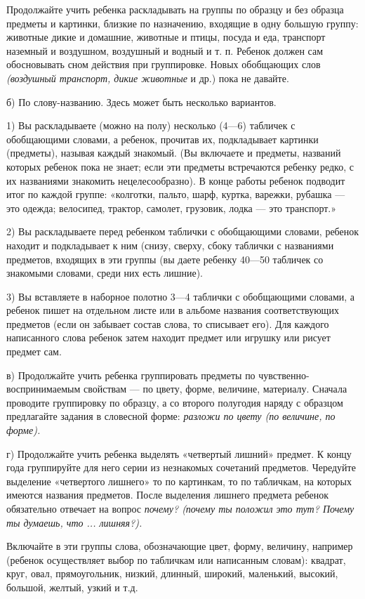 \documentclass[a5paper]{book}
\renewcommand{\emph}[1]{\textit{#1}}
\begin{document}
Продолжайте учить ребенка раскладывать на группы по образцу и без
образца предметы и картинки, близкие по назначению, входящие в одну
большую группу: животные дикие и домашние, животные и птицы, посуда и
еда, транспорт наземный и воздушном, воздушный и водный и т. п. Ребенок
должен сам обосновывать сном действия при группировке. Новых обобщающих
слов \emph{(воздушный транспорт, дикие животные} и др.) пока не давайте.

б) По слову-названию. Здесь может быть несколько вариантов.

1) Вы раскладываете (можно на полу) несколько (4---6) табличек с
обобщающими словами, а ребенок, прочитав их, подкладывает картинки
(предметы), называя каждый знакомый. (Вы включаете и предметы, названий
которых ребенок пока не знает; если эти предметы встречаются ребенку
редко, с их названиями знакомить нецелесообразно). В конце работы
ребенок подводит итог по каждой группе: «колготки, пальто, шарф, куртка,
варежки, рубашка --- это одежда; велосипед, трактор, самолет, грузовик,
лодка --- это транспорт.»

2) Вы раскладываете перед ребенком таблички с обобщающими словами,
ребенок находит и подкладывает к ним (снизу, сверху, сбоку таблички с
названиями предметов, входящих в эти группы (вы даете ребенку 40---50
табличек со знакомыми словами, среди них есть лишние).

3) Вы вставляете в наборное полотно 3---4 таблички с обобщающими
словами, а ребенок пишет на отдельном листе или в альбоме названия
соответствующих предметов (если он забывает состав слова, то списывает
его). Для каждого написанного слова ребенок затем находит предмет или
игрушку или рисует предмет сам.

в) Продолжайте учить ребенка группировать предметы по
чувственно-воспринимаемым свойствам --- по цвету, форме, величине,
материалу. Сначала проводите группировку по образцу, а со второго
полугодия наряду с образцом предлагайте задания в словесной форме:
\emph{разложи по цвету (по величине, по форме).}

г) Продолжайте учить ребенка выделять «четвертый лишний» предмет. К
концу года группируйте для него серии из незнакомых сочетаний предметов.
Чередуйте выделение «четвертого лишнего» то по картинкам, то по
табличкам, на которых имеются названия предметов. После выделения
лишнего предмета ребенок обязательно отвечает на вопрос \emph{почему?
(почему ты положил это тут? Почему ты думаешь, что ... лишняя?).}

Включайте в эти группы слова, обозначающие цвет, форму, величину,
например (ребенок осуществляет выбор по табличкам или написанным
словам): квадрат, круг, овал, прямоугольник, низкий, длинный, широкий,
маленький, высокий, большой, желтый, узкий и т.д.
\end{document}
